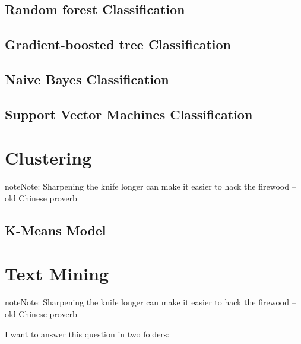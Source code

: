 \documentclass[letterpaper,11pt,english]{sphinxmanual}
\begin{document}
\section{Random forest Classification}
\label{classification:random-forest-classification}

\section{Gradient-boosted tree Classification}
\label{classification:gradient-boosted-tree-classification}

\section{Naive Bayes Classification}
\label{classification:naive-bayes-classification}

\section{Support Vector Machines Classification}
\label{classification:support-vector-machines-classification}

\chapter{Clustering}
\label{clustering:clustering}\label{clustering:yassine-alouini}\label{clustering::doc}\label{clustering:id1}
\begin{notice}{note}{Note:}
Sharpening the knife longer can make it easier to hack the firewood -- old Chinese proverb
\end{notice}


\section{K-Means Model}
\label{clustering:k-means-model}

\chapter{Text Mining}
\label{textmining:yassine-alouini}\label{textmining:text-mining}\label{textmining::doc}\label{textmining:textmining}
\begin{notice}{note}{Note:}
Sharpening the knife longer can make it easier to hack the firewood -- old Chinese proverb
\end{notice}

I want to answer this question in two folders:
\end{document}
